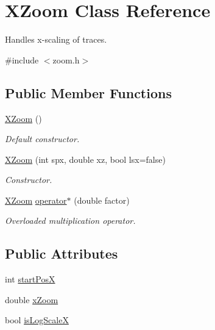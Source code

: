 \hypertarget{classXZoom}{
\section{XZoom Class Reference}
\label{classXZoom}
}


Handles x-\/scaling of traces.  




{\ttfamily \#include $<$zoom.h$>$}

\subsection*{Public Member Functions}
\begin{DoxyCompactItemize}
\item 
\hypertarget{classXZoom_a0f9829ec0dc10c2f99877150c60c0227}{
\hyperlink{classXZoom_a0f9829ec0dc10c2f99877150c60c0227}{XZoom} ()}
\label{classXZoom_a0f9829ec0dc10c2f99877150c60c0227}

\begin{DoxyCompactList}\small\item\em Default constructor. \item\end{DoxyCompactList}\item 
\hyperlink{classXZoom_a00865c9f2f4234b16ccf6d8ad96c7137}{XZoom} (int spx, double xz, bool lsx=false)
\begin{DoxyCompactList}\small\item\em Constructor. \item\end{DoxyCompactList}\item 
\hypertarget{classXZoom_afa097eead24ae150e65d62ee27100fa4}{
\hyperlink{classXZoom}{XZoom} \hyperlink{classXZoom_afa097eead24ae150e65d62ee27100fa4}{operator$\ast$} (double factor)}
\label{classXZoom_afa097eead24ae150e65d62ee27100fa4}

\begin{DoxyCompactList}\small\item\em Overloaded multiplication operator. \item\end{DoxyCompactList}\end{DoxyCompactItemize}
\subsection*{Public Attributes}
\begin{DoxyCompactItemize}
\item 
int \hyperlink{classXZoom_a0417c9b15b4a317cd3cd67a43dd77d54}{startPosX}
\item 
double \hyperlink{classXZoom_a3317bfee8a039b7e8dcf1bfa0346ed32}{xZoom}
\item 
bool \hyperlink{classXZoom_a8d63712f3a4c68497a82b4667221ec69}{isLogScaleX}
\end{DoxyCompactItemize}


